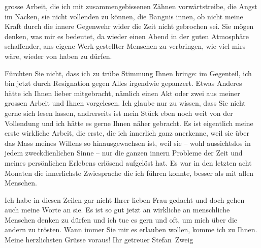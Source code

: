                grosse Arbeit, die ich mit
               zusammengebissenen Zähnen vorwärts{\pb}treibe, die Angst im Nacken, sie nicht vollenden zu können, die Bangnis innen, ob
               nicht meine Kraft durch die innere Gegenwehr wider die Zeit nicht gebrochen sei. Sie
               mögen denken, was mir es bedeutet, da wieder einen Abend in der guten Atmosphäre
               schaffender, ans eigene Werk gestellter Menschen zu verbringen, wie viel mirs wäre,
               wieder von \label{K_L03659-2v}\label{K_L03659-2} haben zu dürfen.\pend
           
\pstart
           Fürchten Sie nicht, dass ich zu trübe Stimmung Ihnen bringe: im Gegenteil, ich bin
               jetzt durch Resignation gegen Alles irgendwie gepanzert. Etwas Anderes hätte ich
               Ihnen lieber mitgebracht, nämlich einen Akt oder zwei aus meiner grossen Arbeit und Ihnen vorgelesen.
               Ich glaube nur zu wissen, dass Sie nicht gerne sich lesen lassen, andrerseits ist
               mein Stück eben noch weit von
               der Vollendung und ich hätte es {\pb}gerne
               Ihnen näher gebracht. Es ist eigentlich meine erste wirkliche Arbeit, die erste, die
               ich innerlich ganz anerkenne, weil sie über das Mass meines Willens so
               hinausgewachsen ist, weil sie – wohl aussichtslos in jedem zweckdienlichen Sinne –
               nur die ganzen innern Probleme der Zeit und meines persönlichen Erlebens erlösend
               aufgelöst hat. Es war in den letzten acht Monaten die innerlichste Zwiesprache die
               ich führen konnte, besser als mit allen Menschen.\pend
           
\pstart
           Ich habe in diesen Zeilen gar nicht Ihrer lieben Frau gedacht und doch gehen auch meine Worte an sie. Es ist
               so gut jetzt an wirkliche an menschliche Menschen denken zu dürfen und ich tue es
               gern und oft, um mich über die andern zu trösten. Wann immer Sie mir es erlauben
               wollen, komme ich zu Ihnen. Meine herzlichsten Grüsse voraus! Ihr getreuer\pend
           \pstart \spacefill\mbox{Stefan Zweig}\pend{}\endnumbering{}
\begin{anhang}
\end{anhang}
      
